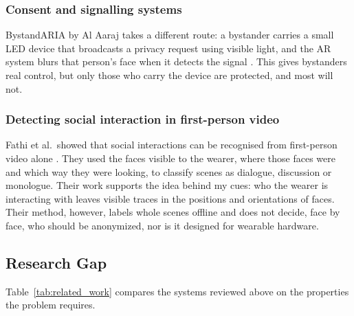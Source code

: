 \subsubsection{Consent and signalling systems}

BystandARIA by Al Aaraj takes a different route: a bystander carries a small LED device
that broadcasts a privacy request using visible light, and the AR system blurs that
person's face when it detects the signal \cite{bystandaria}. This gives bystanders real
control, but only those who carry the device are protected, and most will not.

\subsubsection{Detecting social interaction in first-person video}

Fathi et al.\ showed that social interactions can be recognised from first-person video
alone \cite{fathi2012social}. They used the faces visible to the wearer, where those faces
were and which way they were looking, to classify scenes as dialogue, discussion or
monologue. Their work supports the idea behind my cues: who the wearer is interacting with
leaves visible traces in the positions and orientations of faces. Their method, however,
labels whole scenes offline and does not decide, face by face, who should be anonymized,
nor is it designed for wearable hardware.

\subsection{Research Gap}
\label{sec:gap}

Table~\ref{tab:related_work} compares the systems reviewed above on the properties the
problem requires.

